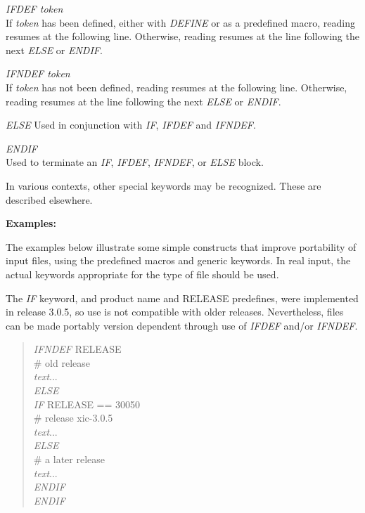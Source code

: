 \begin{description}
\item{\it IFDEF token}\\
If {\it token} has been defined, either with {\it DEFINE} or as a
predefined macro, reading resumes at the following line.  Otherwise,
reading resumes at the line following the next {\it ELSE} or {\it
ENDIF\/}.

\item{\it IFNDEF token}\\
If {\it token} has not been defined, reading resumes at the
following line.  Otherwise, reading resumes at the line following
the next {\it ELSE} or {\it ENDIF\/}.

\item{\it ELSE}
Used in conjunction with {\it IF}, {\it IFDEF} and {\it IFNDEF\/}.

\item{\it ENDIF}\\
Used to terminate an {\it IF}, {\it IFDEF}, {\it IFNDEF\/}, or
{\it ELSE} block.
\end{description}

In various contexts, other special keywords may be recognized.
These are described elsewhere.

{\bf Examples:}

The examples below illustrate some simple constructs that improve
portability of input files, using the predefined macros and generic
keywords.  In real input, the actual keywords appropriate for the type
of file should be used.

The {\it IF} keyword, and product name and {\vt RELEASE} predefines,
were implemented in release 3.0.5, so use is not compatible with older
releases.  Nevertheless, files can be made portably version dependent
through use of {\it IFDEF} and/or {\it IFNDEF\/}.

\begin{quote}
{\it IFNDEF} {\vt RELEASE}\\
\# old release\\
{\it text\/}...\\
{\it ELSE}\\
{\it IF} {\vt RELEASE == 30050}\\
\# release xic-3.0.5\\
{\it text\/}...\\
{\it ELSE}\\
\# a later release\\
{\it text\/}...\\
{\it ENDIF}\\
{\it ENDIF}\\
\end{quote}

